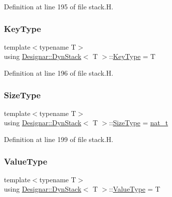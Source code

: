 Definition at line 195 of file stack.\+H.

\mbox{\label{class_designar_1_1_dyn_stack_a4a4fd39e08b25a05641fb888b99261c8}} 
\subsubsection{\texorpdfstring{Key\+Type}{KeyType}}
{\footnotesize\ttfamily template$<$typename T$>$ \\
using \hyperlink{class_designar_1_1_dyn_stack}{Designar\+::\+Dyn\+Stack}$<$ T $>$\+::\hyperlink{class_designar_1_1_fixed_array_a3a725cf21783340b8aca29dd1db0acf0}{Key\+Type} =  T}



Definition at line 196 of file stack.\+H.

\mbox{\label{class_designar_1_1_dyn_stack_adb2c839a5bc34354be458c86dd35f5b8}} 
\subsubsection{\texorpdfstring{Size\+Type}{SizeType}}
{\footnotesize\ttfamily template$<$typename T$>$ \\
using \hyperlink{class_designar_1_1_dyn_stack}{Designar\+::\+Dyn\+Stack}$<$ T $>$\+::\hyperlink{class_designar_1_1_fixed_array_a503ae414cc313d248e77c08e62ef043c}{Size\+Type} =  \hyperlink{namespace_designar_aa72662848b9f4815e7bf31a7cf3e33d1}{nat\+\_\+t}}



Definition at line 199 of file stack.\+H.

\mbox{\label{class_designar_1_1_dyn_stack_a511da1dd717eb6f9c5b143b2a8543176}} 
\subsubsection{\texorpdfstring{Value\+Type}{ValueType}}
{\footnotesize\ttfamily template$<$typename T$>$ \\
using \hyperlink{class_designar_1_1_dyn_stack}{Designar\+::\+Dyn\+Stack}$<$ T $>$\+::\hyperlink{class_designar_1_1_fixed_array_ac1cfeb4403a2dcbffd7ef494e5b873d0}{Value\+Type} =  T}



